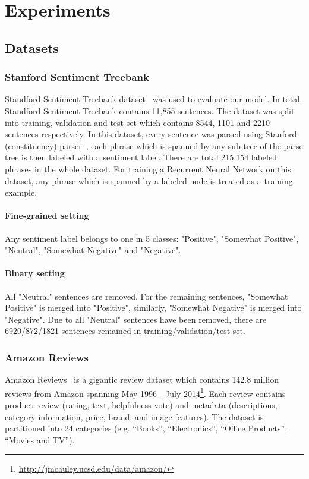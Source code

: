 \section{Experiments}
\subsection{Datasets}
\subsubsection{Stanford Sentiment Treebank} \label{sec:sst}
Standford Sentiment Treebank dataset~\cite{socher2013recursive} was used to evaluate our model.
In total, Standford Sentiment Treebank contains 11,855 sentences.
The dataset was split into training, validation and test set which contains 8544, 1101 and 2210 sentences respectively.
In this dataset, every sentence was parsed using Stanford (constituency) parser~\cite{socher2013recursive}, each phrase which is spanned by any sub-tree of the parse tree is then labeled with  a sentiment label.
There are total 215,154 labeled phrases in the whole dataset.
For training a Recurrent Neural Network on this dataset, any phrase which is spanned by a labeled node is treated as a training example. 
\paragraph{Fine-grained setting} Any sentiment label belongs to one in 5 classes: "Positive", "Somewhat Positive", "Neutral", "Somewhat Negative" and "Negative".
\paragraph{Binary setting} All "Neutral" sentences are removed.
For the remaining sentences, "Somewhat Positive" is merged into "Positive", similarly, "Somewhat Negative" is merged into "Negative".
Due to all "Neutral" sentences have been removed, there are 6920/872/1821 sentences remained in training/validation/test set.
\subsubsection{Amazon Reviews}\label{sec:amazon}
Amazon Reviews~\cite{amazon-reviews} is a gigantic review dataset
which contains 142.8 million reviews from Amazon spanning May 1996 - July 2014\footnote{\url{http://jmcauley.ucsd.edu/data/amazon/}}.
Each review contains product review (rating, text, helpfulness vote) and metadata (descriptions, category information, price, brand, and image features).
The dataset is partitioned into 24 categories (e.g. ``Books'', ``Electronics'', ``Office Products'', ``Movies and TV'').
